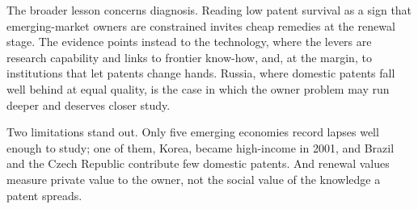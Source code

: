 The broader lesson concerns diagnosis. Reading low patent survival as a sign that emerging-market owners are
constrained invites cheap remedies at the renewal stage. The evidence points instead to the technology, where the
levers are research capability and links to frontier know-how, and, at the margin, to institutions that let patents
change hands. Russia, where domestic patents fall well behind at equal quality, is the case in which the owner
problem may run deeper and deserves closer study.

Two limitations stand out. Only five emerging economies record lapses well enough to study; one of them, Korea, became
high-income in 2001, and Brazil and the Czech Republic contribute few domestic patents. And renewal values measure private value to the owner, not the social value of the
knowledge a patent spreads.
